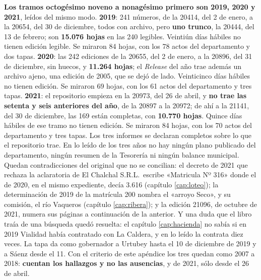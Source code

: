 \textbf{Los tramos octogésimo noveno a nonagésimo primero son 2019, 2020 y 2021}, leídos del mismo modo. \textbf{2019}: 241 números, de la 20414, del 2 de enero, a la 20654, del 30 de diciembre, todos con archivo, pero \textbf{uno trunco}, la 20444, del 13 de febrero; son \textbf{15.076 hojas} en las 240 legibles. Veintiún días hábiles no tienen edición legible. Se miraron 84 hojas, con los 78 actos del departamento y dos tapas. \textbf{2020}: las 242 ediciones de la 20655, del 2 de enero, a la 20896, del 31 de diciembre, sin huecos, y \textbf{11.264 hojas}; el \textit{Release} del año trae además un archivo ajeno, una edición de 2005, que se dejó de lado. Veinticinco días hábiles no tienen edición. Se miraron 69 hojas, con los 61 actos del departamento y tres tapas. \textbf{2021}: el repositorio empieza en la 20973, del 26 de abril, y \textbf{no trae las setenta y seis anteriores del año}, de la 20897 a la 20972; de ahí a la 21141, del 30 de diciembre, las 169 están completas, con \textbf{10.770 hojas}. Quince días hábiles de ese tramo no tienen edición. Se miraron 84 hojas, con los 70 actos del departamento y tres tapas. Los tres informes se declaran completos sobre lo que el repositorio trae. En lo leído de los tres años no hay ningún plano publicado del departamento, ningún resumen de la Tesorería ni ningún balance municipal. Quedan contradicciones del original que no se concilian: el decreto de 2021 que rechaza la aclaratoria de El Chalchal S.R.L.\ escribe «Matricula Nº 316» donde el de 2020, en el mismo expediente, decía 3.616 (capítulo \ref{cap:loteo}); la determinación de 2019 de la matrícula 200 nombra el «arroyo Seco», y su comisión, el río Vaqueros (capítulo \ref{cap:ribera}); y la edición 21096, de octubre de 2021, numera sus páginas a continuación de la anterior. Y una duda que el libro traía de una búsqueda quedó resuelta: el capítulo \ref{cap:hacienda} no sabía si en 2019 Vialidad había contratado con La Caldera, y en lo leído la contrata diez veces. La tapa da como gobernador a Urtubey hasta el 10 de diciembre de 2019 y a Sáenz desde el 11. Con el criterio de este apéndice los tres quedan como 2007 a 2018: \textbf{cuentan los hallazgos y no las ausencias}, y de 2021, sólo desde el 26 de abril.

